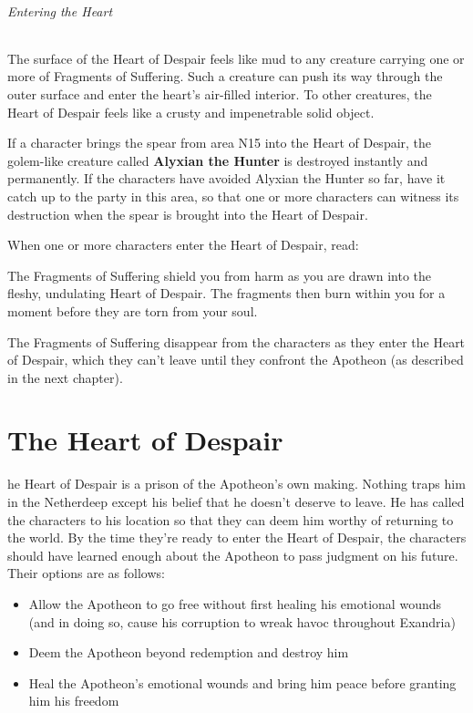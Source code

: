 \documentclass[10pt,a4paper,twoside,bg=print,twocolumn,openany,nodeprecatedcode]{dndbook}
\begin{document}
\subparagraph{Entering the Heart}
The surface of the Heart of Despair feels like mud to any creature carrying one or more of Fragments of Suffering. Such a creature can push its way through the outer surface and enter the heart's air-filled interior. To other creatures, the Heart of Despair feels like a crusty and impenetrable solid object.

If a character brings the spear from area N15 into the Heart of Despair, the golem-like creature called \textbf{Alyxian the Hunter} is destroyed instantly and permanently. If the characters have avoided Alyxian the Hunter so far, have it catch up to the party in this area, so that one or more characters can witness its destruction when the spear is brought into the Heart of Despair.

When one or more characters enter the Heart of Despair, read:

\begin{DndReadAloud}{}
The Fragments of Suffering shield you from harm as you are drawn into the fleshy, undulating Heart of Despair. The fragments then burn within you for a moment before they are torn from your soul.

\end{DndReadAloud}

The Fragments of Suffering disappear from the characters as they enter the Heart of Despair, which they can't leave until they confront the Apotheon (as described in the next chapter).

\chapter{The Heart of Despair}
he Heart of Despair is a prison of the Apotheon's own making. Nothing traps him in the Netherdeep except his belief that he doesn't deserve to leave. He has called the characters to his location so that they can deem him worthy of returning to the world. By the time they're ready to enter the Heart of Despair, the characters should have learned enough about the Apotheon to pass judgment on his future. Their options are as follows:



\begin{itemize}
\item Allow the Apotheon to go free without first healing his emotional wounds (and in doing so, cause his corruption to wreak havoc throughout Exandria)
\item Deem the Apotheon beyond redemption and destroy him
\item Heal the Apotheon's emotional wounds and bring him peace before granting him his freedom
\end{itemize}
\end{document}
